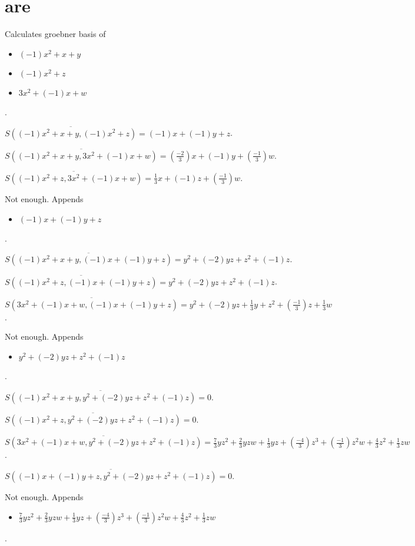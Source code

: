 \section{are}Calculates groebner basis of
\begin{itemize}
\item $(-1)x^{2}+x+y$
\item $(-1)x^{2}+z$
\item $3x^{2}+(-1)x+w$
\end{itemize}  .


$\overline{S((-1)x^{2}+x+y, (-1)x^{2}+z)} = (-1)x+(-1)y+z$.

$\overline{S((-1)x^{2}+x+y, 3x^{2}+(-1)x+w)} = (\frac{-2}{3})x+(-1)y+(\frac{-1}{3})w$.

$\overline{S((-1)x^{2}+z, 3x^{2}+(-1)x+w)} = \frac{1}{3}x+(-1)z+(\frac{-1}{3})w$.

Not enough.  Appends \begin{itemize}
\item $(-1)x+(-1)y+z$
\end{itemize}  .


$\overline{S((-1)x^{2}+x+y, (-1)x+(-1)y+z)} = y^{2}+(-2)yz+z^{2}+(-1)z$.

$\overline{S((-1)x^{2}+z, (-1)x+(-1)y+z)} = y^{2}+(-2)yz+z^{2}+(-1)z$.

$\overline{S(3x^{2}+(-1)x+w, (-1)x+(-1)y+z)} = y^{2}+(-2)yz+\frac{1}{3}y+z^{2}+(\frac{-1}{3})z+\frac{1}{3}w$.

Not enough.  Appends \begin{itemize}
\item $y^{2}+(-2)yz+z^{2}+(-1)z$
\end{itemize}  .


$\overline{S((-1)x^{2}+x+y, y^{2}+(-2)yz+z^{2}+(-1)z)} = 0$.

$\overline{S((-1)x^{2}+z, y^{2}+(-2)yz+z^{2}+(-1)z)} = 0$.

$\overline{S(3x^{2}+(-1)x+w, y^{2}+(-2)yz+z^{2}+(-1)z)} = \frac{7}{3}yz^{2}+\frac{2}{3}yzw+\frac{1}{3}yz+(\frac{-4}{3})z^{3}+(\frac{-1}{3})z^{2}w+\frac{4}{3}z^{2}+\frac{1}{3}zw$.

$\overline{S((-1)x+(-1)y+z, y^{2}+(-2)yz+z^{2}+(-1)z)} = 0$.

Not enough.  Appends \begin{itemize}
\item $\frac{7}{3}yz^{2}+\frac{2}{3}yzw+\frac{1}{3}yz+(\frac{-4}{3})z^{3}+(\frac{-1}{3})z^{2}w+\frac{4}{3}z^{2}+\frac{1}{3}zw$
\end{itemize}  .


